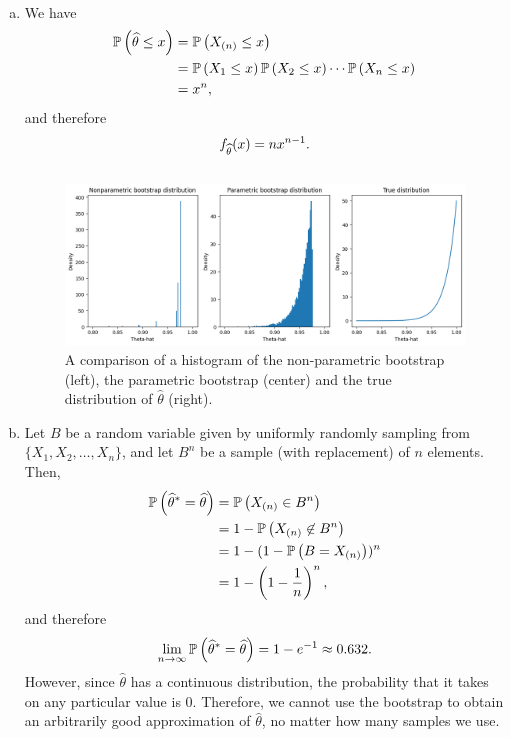 \begin{ex}~
  \begin{enumerate}[(a)]
    \item We have
          \begin{align*}
            \P{\widehat{\theta}\leq x}
             & =\P{X_{(n)}\leq x}                               \\
             & =\P{X_{1}\leq x}\P{X_2\leq x}\cdots\P{X_n\leq x} \\
             & =x^n,
          \end{align*}
          and therefore
          \[
            f_{\widehat{\theta}}(x)=nx^{n-1}. \\
          \]

          \inputminted{python}{../code/09-10.py}

          \begin{figure}[H]
            \centering
            \includegraphics[scale=0.53]{../images/09-10}
            \caption{
              A comparison of a histogram of the non-parametric bootstrap
              (left), the parametric bootstrap (center) and the true
              distribution of $\widehat{\theta}$ (right).}
          \end{figure}
    \item Let $B$ be a random variable given by uniformly randomly sampling
          from $\{X_1,X_2,\ldots,X_n\}$, and let $B^n$ be a sample (with
          replacement) of $n$ elements. Then,
          \begin{align*}
            \P{\widehat{\theta}^*=\widehat{\theta}}
             & =\P{X_{(n)}\in B^n}              \\
             & =1-\P{X_{(n)}\not\in B^n}        \\
             & =1-(1-\P{B = X_{(n)}})^n         \\
             & =1-\left(1-\frac{1}{n}\right)^n,
          \end{align*}
          and therefore
          \[
            \lim_{n\to\infty}\P{\widehat{\theta}^*
              =\widehat{\theta}}
            =1-e^{-1}
            \approx 0.632.
          \]
          However, since $\widehat{\theta}$ has a continuous distribution, the
          probability that it takes on any particular value is $0$. Therefore,
          we cannot use the bootstrap to obtain an arbitrarily good
          approximation of $\widehat{\theta}$, no matter how many samples we
          use.
  \end{enumerate}
\end{ex}